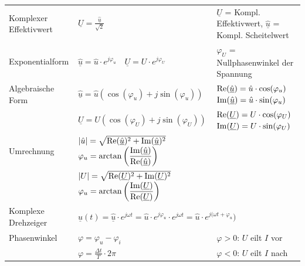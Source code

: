 			\begin{tabular}{p{4.0cm}p{5.5cm}p{8.5cm}}
            	Komplexer Effektivwert &
            		$\underline{U} = \frac{\underline{\hat{u}}}{\sqrt{2}}$ &
            		$\underline{U}$ = Kompl. Effektivwert, $\underline{\hat{u}}$ = Kompl. Scheitelwert \\
				Exponentialform &
					$\underline{\hat{u}} = \hat{u} \cdot e^{j\varphi_u} \quad \underline{U} = U \cdot e^{j\varphi_U}$  &
					$\varphi_U$ = Nullphasenwinkel der Spannung\\
				Algebraische Form &
					$\underline{\hat{u}} = \hat{u} (\cos(\varphi_u)+j\sin(\varphi_u))$ &
					$\operatorname{Re}(\underline{\hat{u}}) = \hat{u} \cdot \cos(\varphi_u)$ \quad $\operatorname{Im}(\underline{\hat{u}}) = \hat{u} \cdot \sin(\varphi_u)$ \\
				&	$\underline{U} = U (\cos(\varphi_U)+j\sin(\varphi_U))$ &
					$\operatorname{Re}(\underline{U}) = U \cdot \cos(\varphi_U)$ \quad $\operatorname{Im}(\underline{U}) = U \cdot \sin(\varphi_U)$ \\
				Umrechnung &
					$|\hat{u}| = \sqrt{\operatorname{Re}(\underline{\hat{u}})^2 + \operatorname{Im}(\underline{\hat{u}})^2}$ \break $\varphi_u = \arctan\left(\dfrac{\operatorname{Im}(\underline{\hat{u}})}{\operatorname{Re}(\underline{\hat{u}})}\right)$ \\
				&	$|U| = \sqrt{\operatorname{Re}(\underline{U})^2 + 		\operatorname{Im}(\underline{U})^2}$ \break
					 $\varphi_u = \arctan\left(\dfrac{\operatorname{Im}(\underline{U})}{\operatorname{Re}(\underline{U})}\right)$ \\
				Komplexe Drehzeiger & 	
					\multicolumn{2}{l}{$\underline{u}(t) = \underline{\hat{u}} \cdot e^{j\omega t} = \hat{u} \cdot e^{j\varphi_u} \cdot e^{j\omega t} = \hat{u} \cdot e^{j(\omega t + \varphi_u})$} \\
				Phasenwinkel & 
					$\varphi = \varphi_u - \varphi_i$ &
					$\varphi > 0$: $U$ eilt $I$ vor\\ 
				& 	$\varphi = \frac{\Delta t}{T}\cdot 2\pi$ &
					$\varphi < 0$: $U$ eilt $I$ nach\\
			\end{tabular}
